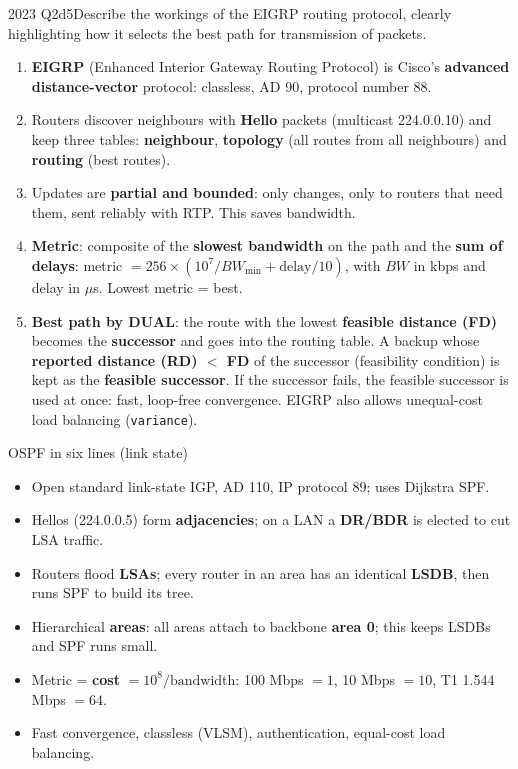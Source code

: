 \documentclass[10pt]{article}
\begin{document}
\begin{pastq}{2023 Q2d}{5}Describe the workings of the EIGRP routing protocol, clearly highlighting how it selects the best path for transmission of packets.\end{pastq}
\begin{ans}
\begin{enumerate}
\item \textbf{EIGRP} (Enhanced Interior Gateway Routing Protocol) is Cisco's \textbf{advanced distance-vector} protocol: classless, AD 90, protocol number 88.
\item Routers discover neighbours with \textbf{Hello} packets (multicast 224.0.0.10) and keep three tables: \textbf{neighbour}, \textbf{topology} (all routes from all neighbours) and \textbf{routing} (best routes).
\item Updates are \textbf{partial and bounded}: only changes, only to routers that need them, sent reliably with RTP. This saves bandwidth.
\item \textbf{Metric}: composite of the \textbf{slowest bandwidth} on the path and the \textbf{sum of delays}: metric $= 256\times(10^7/BW_{\min} + \text{delay}/10)$, with $BW$ in kbps and delay in $\mu$s. Lowest metric = best.
\item \textbf{Best path by DUAL}: the route with the lowest \textbf{feasible distance (FD)} becomes the \textbf{successor} and goes into the routing table. A backup whose \textbf{reported distance (RD) $<$ FD} of the successor (feasibility condition) is kept as the \textbf{feasible successor}. If the successor fails, the feasible successor is used at once: fast, loop-free convergence. EIGRP also allows unequal-cost load balancing (\texttt{variance}).
\end{enumerate}
\end{ans}

\begin{keydef}{OSPF in six lines (link state)}
\begin{itemize}
\item Open standard link-state IGP, AD 110, IP protocol 89; uses Dijkstra SPF.
\item Hellos (224.0.0.5) form \textbf{adjacencies}; on a LAN a \textbf{DR/BDR} is elected to cut LSA traffic.
\item Routers flood \textbf{LSAs}; every router in an area has an identical \textbf{LSDB}, then runs SPF to build its tree.
\item Hierarchical \textbf{areas}: all areas attach to backbone \textbf{area 0}; this keeps LSDBs and SPF runs small.
\item Metric = \textbf{cost} $= 10^8 / \text{bandwidth}$: 100 Mbps $=1$, 10 Mbps $=10$, T1 1.544 Mbps $=64$.
\item Fast convergence, classless (VLSM), authentication, equal-cost load balancing.
\end{itemize}
\end{keydef}
\end{document}
